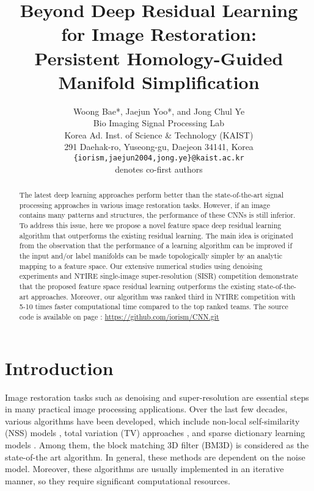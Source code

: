 \documentclass[10pt,twocolumn,letterpaper]{article}
\begin{document}
\title{Beyond Deep Residual Learning for Image Restoration: \\ Persistent Homology-Guided Manifold Simplification }

\author{Woong Bae*, Jaejun Yoo*, and Jong Chul Ye\\
Bio Imaging Signal Processing Lab\\
Korea Ad. Inst. of Science \& Technology (KAIST) \\
291 Daehak-ro, Yuseong-gu, Daejeon 34141, Korea
\\
{\tt\small \{iorism,jaejun2004,jong.ye\}@kaist.ac.kr}\\
{\small * denotes co-first authors}}

\maketitle


\begin{abstract}
The latest deep learning approaches perform better than the state-of-the-art signal processing approaches in various
image restoration tasks. However, if an image contains many patterns and structures, the performance of these CNNs is still inferior. To address this issue, here we propose a novel feature space deep residual learning algorithm that outperforms the existing residual learning. The main idea is originated from the observation
that the performance of a learning algorithm can be improved if the input and/or label manifolds can
be made topologically simpler by an analytic mapping to a feature space. 
Our extensive numerical studies using denoising experiments and NTIRE single-image super-resolution (SISR) competition demonstrate that the proposed feature space residual learning
outperforms the existing state-of-the-art approaches. Moreover, our algorithm was ranked third in NTIRE competition with 5-10 times faster computational time compared to the top ranked teams. The source code is available on page : \href{url}{https://github.com/iorism/CNN.git}

\end{abstract}

\section{Introduction}

Image restoration tasks such as denoising and super-resolution are essential steps in many practical image processing applications. Over the last few decades, various algorithms have been developed, which include
non-local self-similarity (NSS) models \cite{buades2008nonlocal}, total variation (TV) approaches \cite{osher2005iterative}, and sparse dictionary learning models \cite{dong2013nonlocally}. Among them, 
the block matching 3D filter (BM3D) \cite{dabov2007image} is considered
as the state-of-the art algorithm.
In general, these methods are dependent on the noise model.
Moreover, these algorithms are usually implemented in an iterative manner, so they require significant computational resources.
\end{document}
